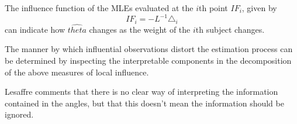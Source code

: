 \documentclass[12pt, a4paper]{report}
\theoremstyle{plain}
\theoremstyle{definition}
\theoremstyle{remark}
\begin{document}
The influence function of the MLEs evaluated at the $i$th point
$IF_{i}$, given by
\begin{equation}
IF_{i} = -L^{-1}\triangle _{i}
\end{equation}
can indicate how $\hat{theta}$ changes as the weight of the $i$th
subject changes.




 The manner by which influential observations
distort the estimation process can be determined by inspecting the
interpretable components in the decomposition of the above
measures of local influence.


Lesaffre comments that there is no clear way of interpreting the
information contained in the angles, but that this doesn't mean
the information should be ignored.



\printindex


\end{document}
